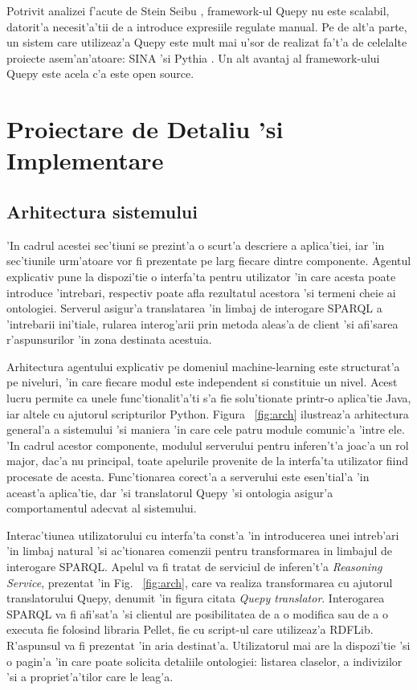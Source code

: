 \documentclass[12pt,a4paper,twoside]{report}
\begin{document}
Potrivit analizei f'acute de Stein Seibu \cite{SteinSaebuOptiqueNLQF:Technologies}, framework-ul Quepy nu este scalabil, datorit'a necesit'a'tii de a introduce expresiile regulate manual. Pe de alt'a parte, un sistem care utilizeaz'a Quepy este mult mai u'sor de realizat fa't'a de celelalte proiecte asem'an'atoare: SINA \cite{Shekarpour2015SINA:Data} 'si Pythia \cite{Unger2011Pythia:Web}. Un alt avantaj al framework-ului Quepy este acela c'a este open source.


\chapter{Proiectare de Detaliu 'si Implementare}
\label{sec:proiectare}

\section{Arhitectura sistemului}

'In cadrul acestei sec'tiuni se prezint'a o scurt'a descriere a aplica'tiei, iar 'in sec'tiunile urm'atoare vor fi prezentate pe larg fiecare dintre componente. Agentul explicativ pune la dispozi'tie o interfa'ta pentru utilizator 'in care acesta poate introduce 'intrebari, respectiv poate afla rezultatul acestora 'si termeni cheie ai ontologiei. Serverul asigur'a translatarea 'in limbaj de interogare SPARQL a 'intrebarii ini'tiale, rularea interog'arii prin metoda aleas'a de client 'si afi'sarea r'aspunsurilor 'in zona destinata acestuia.

Arhitectura agentului explicativ pe domeniul machine-learning este structurat'a pe niveluri, 'in care fiecare modul este independent si constituie un nivel. Acest lucru permite ca unele func'tionalit'a'ti s'a fie solu'tionate printr-o aplica'tie Java, iar altele cu ajutorul scripturilor Python. Figura ~\ref{fig:arch} ilustreaz'a arhitectura general'a a sistemului 'si maniera 'in care cele patru module comunic'a 'intre ele. 'In cadrul acestor componente, modulul serverului pentru inferen't'a joac'a un rol major, dac'a nu principal, toate apelurile provenite de la interfa'ta utilizator fiind procesate de acesta. Func'tionarea corect'a a serverului este esen'tial'a 'in aceast'a aplica'tie, dar 'si translatorul Quepy 'si ontologia asigur'a comportamentul adecvat al sistemului.

Interac'tiunea utilizatorului cu interfa'ta const'a 'in introducerea unei intreb'ari 'in limbaj natural 'si ac'tionarea comenzii pentru transformarea in limbajul de interogare SPARQL. Apelul va fi tratat de serviciul de inferen't'a {\it Reasoning Service}, prezentat 'in Fig. ~\ref{fig:arch}, care va realiza transformarea cu ajutorul translatorului Quepy, denumit 'in figura citata {\it Quepy translator}. Interogarea SPARQL va fi afi'sat'a 'si clientul are posibilitatea de a o modifica sau de a o executa fie folosind libraria Pellet, fie cu script-ul care utilizeaz'a RDFLib. R'aspunsul va fi prezentat 'in aria destinat'a. Utilizatorul mai are la dispozi'tie 'si o pagin'a 'in care poate solicita detaliile ontologiei: listarea claselor, a indivizilor 'si a propriet'a'tilor care le leag'a.
\end{document}
